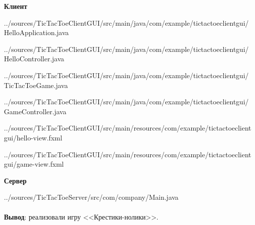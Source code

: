 \documentclass[12pt, a4paper, simple]{eskdtext}
\begin{document}
    \begin{center}
        \textbf{Клиент}
    \end{center}

    
    {../sources/TicTacToeClientGUI/src/main/java/com/example/tictactoeclientgui/HelloApplication.java}
    
    {../sources/TicTacToeClientGUI/src/main/java/com/example/tictactoeclientgui/HelloController.java}
    
    {../sources/TicTacToeClientGUI/src/main/java/com/example/tictactoeclientgui/TicTacToeGame.java}
    
    {../sources/TicTacToeClientGUI/src/main/java/com/example/tictactoeclientgui/GameController.java}
    
    {../sources/TicTacToeClientGUI/src/main/resources/com/example/tictactoeclientgui/hello-view.fxml}
    
    {../sources/TicTacToeClientGUI/src/main/resources/com/example/tictactoeclientgui/game-view.fxml}

    \begin{center}
        \textbf{Сервер}
    \end{center}

    
    {../sources/TicTacToeServer/src/com/company/Main.java}


    \paragraph{} \textbf{Вывод}: реализовали игру <<Крестики-нолики>>.

\end{document}
